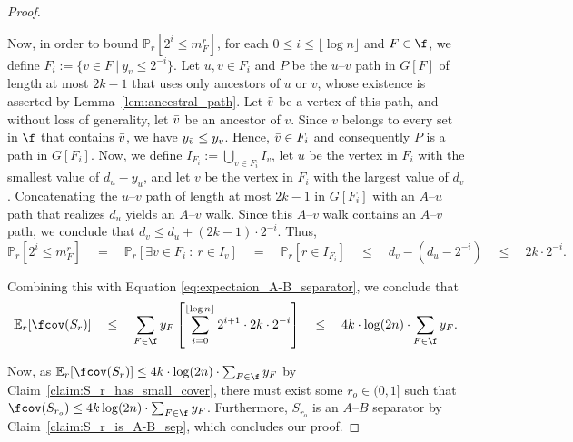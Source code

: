 \begin{proof}
\begin{claimproof}
        Now, in order to bound $\mathbb{P}_r[2^i \leq m_F^r]$, for each $0 \leq i \leq \lfloor \log n \rfloor$ and $F \in \f$, we define $F_i := \{v\in F\ |\ y_v\leq 2^{-i}\}$. Let $u, v \in F_i$ and $P$ be the $u$--$v$ path in $G[F]$ of length at most $2k-1$ that uses only ancestors of $u$ or $v$, whose existence is asserted by Lemma~\ref{lem:ancestral_path}. Let $\Bar{v}$ be a vertex of this path, and without loss of generality, let $\Bar{v}$ be an ancestor of $v$. Since $v$ belongs to every set in $\f$ that contains $\Bar{v}$, we have $y_{\Bar{v}} \leq y_v$. Hence, $\Bar{v} \in F_i$ and consequently $P$ is a path in $G[F_i]$.
        Now, we define $I_{F_i} := \bigcup_{v \in F_i} I_v$, let $u$ be the vertex in $F_i$ with the smallest value of $d_u - y_u$, and let $v$ be the vertex in $F_i$ with the largest value of $d_v$. Concatenating the $u$--$v$ path of length at most $2k-1$ in $G[F_i]$ with an $A$--$u$ path that realizes $d_u$ yields an $A$--$v$ walk. Since this $A$--$v$ walk contains an $A$--$v$ path, we conclude that $d_v \le d_u + (2k-1) \cdot 2^{-i}$.
        Thus, 
        $$
        \mathbb{P}_r[2^i \leq m_F^r] 
        \quad = \quad \mathbb{P}_r\left[\exists v \in F_i\ :\ r \in I_v \right] 
        \quad = \quad \mathbb{P}_r\left[r \in I_{F_i} \right] 
        \quad \leq \quad d_v - (d_u-2^{-i}) 
        \quad \leq \quad 2k \cdot 2^{-i}.
        $$
        
        Combining this with Equation \ref{eq:expectaion_A-B_separator}, we conclude that 
        $$
        \mathbb{E}_r[\fcov(S_r)] \quad
        \leq \quad \sum_{F \in \f} y_F \left[ \sum_{i = 0}^{\lfloor \log n \rfloor} 2^{i+1} \cdot 2k \cdot 2^{-i} \right] \quad
        \leq \quad 4k \cdot \log(2n) \cdot \sum_{F \in \f} y_F. 
        $$
    \end{claimproof}
    
    Now, as $\mathbb{E}_r[\fcov(S_r)] \leq 4k \cdot \log(2n) \cdot \sum_{F \in \f} y_F$ by Claim~\ref{claim:S_r_has_small_cover}, there must exist some $r_o\in(0,1]$ such that %
    $\fcov(S_{r_o}) \leq 4k \log(2n) \cdot \sum_{F \in \f} y_F$. Furthermore, $S_{r_o}$ is an $A$--$B$ separator by Claim~\ref{claim:S_r_is_A-B_sep}, which concludes our proof.
\end{proof}

